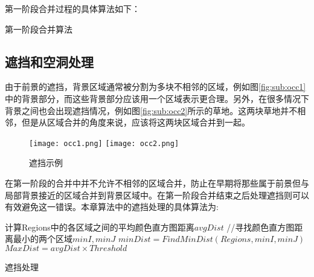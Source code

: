 第一阶段合并过程的具体算法如下：



\renewcommand{\algorithmcfname}{算法}
\begin{algorithm}[htb]
\LinesNumbered
{}

\label{alg:algMergeP1}
\caption{第一阶段合并算法}
\end{algorithm}

\subsection{遮挡和空洞处理}
\label{subsec:mergeP2}

由于前景的遮挡，背景区域通常被分割为多块不相邻的区域，例如图\ref{fig:sub:occ1}中的背景部分，而这些背景部分应该用一个区域表示更合理。另外，在很多情况下背景之间也会出现遮挡情况，例如图\ref{fig:sub:occ2}所示的草地。这两块草地并不相邻，但是从区域合并的角度来说，应该将这两块区域合并到一起。
\begin{figure}[htb]
  \centering%
    {\texttt{[image: occ1.png]}}%
 \hspace{1em}%
      {\texttt{[image: occ2.png]}}

  \caption{遮挡示例}
  \label{fig:occ}
\end{figure}
在第一阶段的合并中并不允许不相邻的区域合并，防止在早期将那些属于前景但与局部背景接近的区域合并到背景区域中。在第一阶段合并结束之后处理遮挡则可以有效避免这一错误。本章算法中的遮挡处理的具体算法为:

\renewcommand{\algorithmcfname}{算法}
\begin{algorithm}[htb]
\LinesNumbered
{}
    计算Regions中的各区域之间的平均颜色直方图距离$avgDist$\;
    //寻找颜色直方图距离最小的两个区域$minI,minJ$\;
    $minDist = FindMinDist(Regions,minI,minJ)$\;
    $MaxDist = avgDist \times Threshold$\;


\label{alg:algMergeP2}
\caption{遮挡处理}
\end{algorithm}
\par

